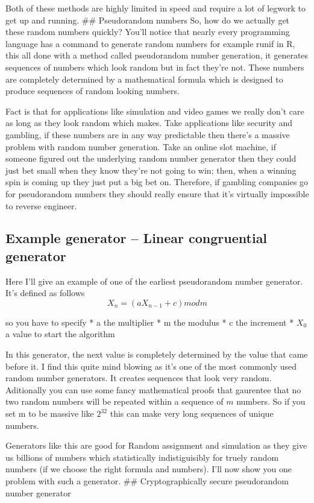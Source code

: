 \documentclass[]{article}
\begin{document}
Both of these methods are highly limited in speed and require a lot of
legwork to get up and running. \#\# Pseudorandom numbers So, how do we
actually get these random numbers quickly? You'll notice that nearly
every programming language has a command to generate random numbers for
example runif in R, this all done with a method called pseudorandom
number generation, it generates sequences of numbers which look random
but in fact they're not. These numbers are completely determined by a
mathematical formula which is designed to produce sequences of random
looking numbers.

Fact is that for applications like simulation and video games we really
don't care as long as they look random which makes. Take applications
like security and gambling, if these numbers are in any way predictable
then there's a massive problem with random number generation. Take an
online slot machine, if someone figured out the underlying random number
generator then they could just bet small when they know they're not
going to win; then, when a winning spin is coming up they just put a big
bet on. Therefore, if gambling companies go for pseudorandom numbers
they should really ensure that it's virtually impossible to reverse
engineer.

\subsection{Example generator -- Linear congruential
generator}\label{example-generator-linear-congruential-generator}

Here I'll give an example of one of the earliest pseudorandom number
generator. It's defined as follows \[X_n=(aX_{n-1}+c)mod m\]

so you have to specify * a the multiplier * m the modulus * c the
increment * \(X_0\) a value to start the algorithm

In this generator, the next value is completely determined by the value
that came before it. I find this quite mind blowing as it's one of the
most commonly used random number generators. It creates sequences that
look very random. Aditionally you can use some fancy mathematical proofs
that gaurentee that no two random numbers will be repeated within a
sequence of \(m\) numbers. So if you set m to be massive like \(2^{32}\)
this can make very long sequences of unique numbers.

Generators like this are good for Random assignment and simulation as
they give us billions of numbers which statistically indistiguisibly for
truely random numbers (if we choose the right formula and numbers). I'll
now show you one problem with such a generator. \#\# Cryptographically
secure pseudorandom number generator
\end{document}
